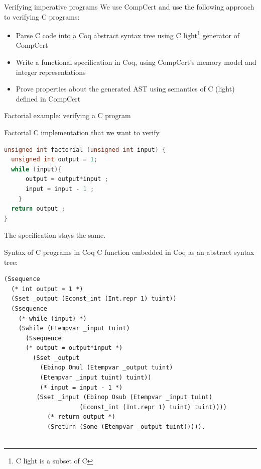\documentclass[10pt]{beamer}
\begin{document}
\begin{frame}{Verifying imperative programs}
    We use CompCert and use the following approach to verifying C programs:
  \begin{itemize}
  \item Parse C code into a Coq abstract syntax tree using C light\footnote{C light is a subset of C} generator of CompCert
  \item Write a functional specification in Coq, using CompCert's memory model and integer representations
  \item Prove properties about the generated AST  using semantics of C (light) defined in CompCert
\end{itemize}
\end{frame}


\begin{frame}[fragile]{Factorial example: verifying a C program}

 Factorial C implementation that we want to verify

\begin{lstlisting}[language=C]
unsigned int factorial (unsigned int input) {
  unsigned int output = 1;
  while (input){
      output = output*input ;
      input = input - 1 ;
    } 
  return output ;
}

\end{lstlisting}

The specification stays the same.

\end{frame}

\begin{frame}[fragile]{ Syntax of C programs in Coq}
C function embedded in Coq as an abstract syntax tree:
  \begin{lstlisting}[language=Coq]
(Ssequence
  (* int output = 1 *)
  (Sset _output (Econst_int (Int.repr 1) tuint)) 
  (Ssequence 
    (* while (input) *)
    (Swhile (Etempvar _input tuint) 
      (Ssequence  
      (* output = output*input *)
        (Sset _output
          (Ebinop Omul (Etempvar _output tuint) 
          (Etempvar _input tuint) tuint)) 
          (* input = input - 1 *)
         (Sset _input (Ebinop Osub (Etempvar _input tuint) 
                     (Econst_int (Int.repr 1) tuint) tuint))))
            (* return output *)
            (Sreturn (Some (Etempvar _output tuint))))).
          
     \end{lstlisting}
     
\end{frame}
\end{document}
